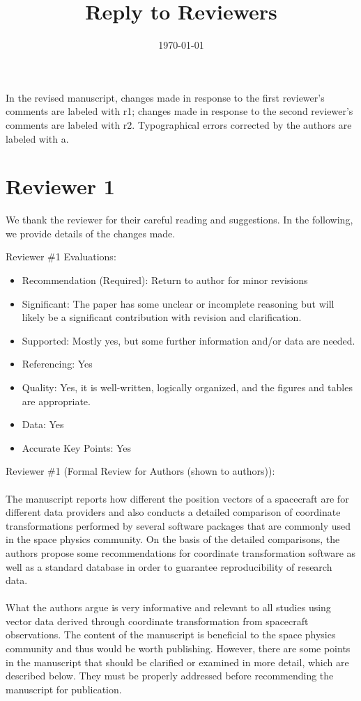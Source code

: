\documentclass[11pt]{article}
\title{\vspace{-0.5in}Reply to Reviewers\vspace{-0.5in}}
\author{}
\date{\today}
\begin{document}
\maketitle	

{\color{violet}
\begin{leftbar}
In the revised manuscript, changes made in response to the first reviewer's comments are labeled with r1; changes made in response to the second reviewer's comments are labeled with r2. Typographical errors corrected by the authors are labeled with a.
\end{leftbar}
}

\section{Reviewer 1}

{\color{violet}
\begin{leftbar}
We thank the reviewer for their careful reading and suggestions. In the following, we provide details of the changes made.
\end{leftbar}
}

Reviewer \#1 Evaluations:
\begin{itemize}
\item[] Recommendation (Required): Return to author for minor revisions
\item[] Significant: The paper has some unclear or incomplete reasoning but will likely be a significant contribution with revision and clarification.
\item[] Supported: Mostly yes, but some further information and/or data are needed.
\item[] Referencing: Yes
\item[] Quality: Yes, it is well-written, logically organized, and the figures and tables are appropriate.
\item[] Data: Yes
\item[] Accurate Key Points: Yes
\end{itemize}


Reviewer \#1 (Formal Review for Authors (shown to authors)):
\\
\\
The manuscript reports how different the position vectors of a spacecraft are for different data providers and also conducts a detailed comparison of coordinate transformations performed by several software packages that are commonly used in the space physics community. On the basis of the detailed comparisons, the authors propose some recommendations for coordinate transformation software as well as a standard database in order to guarantee reproducibility of research data.
\\
\\
What the authors argue is very informative and relevant to all studies using vector data derived through coordinate transformation from spacecraft observations. The content of the manuscript is beneficial to the space physics community and thus would be worth publishing. However, there are some points in the manuscript that should be clarified or examined in more detail, which are described below. They must be properly addressed before recommending the manuscript for publication.
\end{document}
